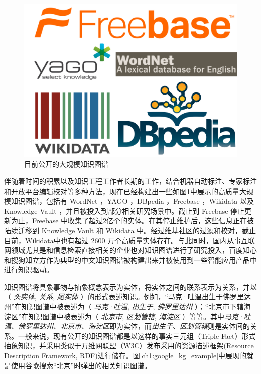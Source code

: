 \vspace{25pt}
\begin{figure}[!htbp]
\setlength{\abovecaptionskip}{30pt} 
\centering
\includegraphics[width=0.8\columnwidth]{figures/ch1/KG_example.png}
\caption{目前公开的大规模知识图谱}
\label{ch1:KG_example}
\end{figure}

伴随着时间的积累以及知识工程工作者长期的工作，结合机器自动标注、专家标注和开放平台编辑校对等多种方法，现在已经构建出一些如图\ref{ch1:KG_example}中展示的高质量大规模知识图谱，包括有 WordNet \cite{miller1995wordnet}，YAGO \cite{hoffart2013yago2}，DBpedia \cite{auer2007dbpedia}，Freebase \cite{bollacker2008freebase}，Wikidata \cite{vrandevcic2014wikidata} 以及 Knowledge Vault \cite{dong2014knowledge}，并且被投入到部分相关研究场景中。截止到 Freebase 停止更新为止，Freebase 中收集了超过$2$亿个的实体。在其停止维护后，这些信息正在被陆续迁移到 Knowledge Vault 和 Wikidata 中。经过维基社区的过滤和校对，截止目前，Wikidata中也有超过 $2600$ 万个高质量实体存在。与此同时，国内从事互联网领域尤其是和信息检索直接相关的企业也对知识图谱进行了研究投入，百度知心和搜狗知立方作为典型的中文知识图谱被构建出来并被使用到一些智能应用产品中进行知识驱动。

知识图谱将具象事物与抽象概念表示为实体，将实体之间的联系表示为关系，并以（ \emph{头实体}, \emph{关系}, \emph{尾实体} ）的形式表述知识。例如，“马克·吐温出生于佛罗里达州”在知识图谱中被表述为（ \emph{马克·吐温}, \emph{出生于}, \emph{佛罗里达州} ）；“北京市下辖海淀区”在知识图谱中被表述为（ \emph{北京市}, \emph{区划管辖}, \emph{海淀区} ）等等。其中\emph{马克·吐温}、\emph{佛罗里达州}、\emph{北京市}、\emph{海淀区}即为实体，而\emph{出生于}、\emph{区划管辖}则是实体间的关系。一般来说，现有公开的知识图谱都是以这样的事实三元组（Triple Fact）形式抽象知识，并采用类似于万维网联盟（W3C）发布采用的资源描述框架(Resource Description Framework, RDF)进行储存。图\ref{ch1:google_kg_example}中展现的就是使用谷歌搜索``北京''时弹出的相关知识图谱。

